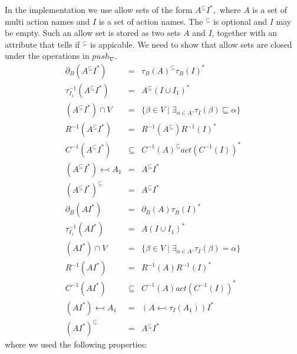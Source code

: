 \documentclass{article}
\begin{document}
In the implementation we use allow sets of the form $A^{\subseteq }I^{\ast },
$ where $A$ is a set of multi action names and $I$ is a set of action names.
The $^{\subseteq }$ is optional and $I$ may be empty. Such an allow set is
stored as two sets $A$ and $I$, together with an attribute that tells if $%
^{\subseteq }$ is appicable. We need to show that allow sets are closed
under the operations in $push_{\nabla }$.%
\[
\begin{array}{lll}
\partial _{B}(A^{\subseteq }I^{\ast }) & = & \tau _{B}(A)^{\subseteq }\tau
_{B}(I)^{\ast } \\ 
\tau _{I_{1}}^{-1}\left( A^{\subseteq }I^{\ast }\right)  & = & A^{\subseteq
}\left( I\cup I_{1}\right) ^{\ast } \\ 
\left( A^{\subseteq }I^{\ast }\right) \cap V & = & \{\beta \in V\mid \exists
_{\alpha \in A}.\tau _{I}(\beta )\sqsubseteq \alpha \} \\ 
R^{-1}\left( A^{\subseteq }I^{\ast }\right)  & = & R^{-1}\left( A^{\subseteq
}\right) R^{-1}\left( I\right) ^{\ast } \\ 
C^{-1}\left( A^{\subseteq }I^{\ast }\right)  & \subseteq  & C^{-1}\left(
A\right) ^{\subseteq }act\left( C^{-1}\left( I\right) \right) ^{\ast } \\ 
\left( A^{\subseteq }I^{\ast }\right) \leftarrowtail A_{1} & = & 
A^{\subseteq }I^{\ast } \\ 
\left( A^{\subseteq }I^{\ast }\right) ^{\subseteq } & = & A^{\subseteq
}I^{\ast } \\ 
\partial _{B}(AI^{\ast }) & = & \partial _{B}(A)\tau _{B}(I)^{\ast } \\ 
\tau _{I_{1}}^{-1}\left( AI^{\ast }\right)  & = & A\left( I\cup I_{1}\right)
^{\ast } \\ 
\left( AI^{\ast }\right) \cap V & = & \{\beta \in V\mid \exists _{\alpha \in
A}.\tau _{I}(\beta )=\alpha \} \\ 
R^{-1}\left( AI^{\ast }\right)  & = & R^{-1}\left( A\right) R^{-1}\left(
I\right) ^{\ast } \\ 
C^{-1}\left( AI^{\ast }\right)  & \subseteq  & C^{-1}\left( A\right)
act\left( C^{-1}\left( I\right) \right) ^{\ast } \\ 
\left( AI^{\ast }\right) \leftarrowtail A_{1} & = & \left( A\leftarrowtail
\tau _{I}(A_{1})\right) I^{\ast } \\ 
\left( AI^{\ast }\right) ^{\subseteq } & = & A^{\subseteq }I^{\ast }%
\end{array}%
\]%
where we used the following properties:%
\end{document}
